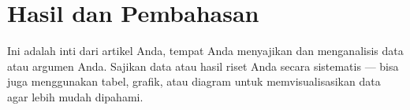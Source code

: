 \section{Hasil dan Pembahasan}


Ini adalah inti dari artikel Anda, tempat Anda menyajikan dan menganalisis data atau argumen Anda. Sajikan data atau hasil riset Anda secara sistematis --- bisa juga menggunakan tabel, grafik, atau diagram untuk memvisualisasikan data agar lebih mudah dipahami.